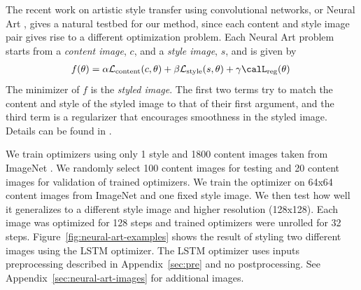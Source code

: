 \documentclass{article}
\begin{document}
The recent work on artistic style transfer using convolutional networks, or
Neural Art \citep{gatys:2015}, gives a natural testbed for our method, since
each content and style image pair gives rise to a different optimization
problem.  Each Neural Art problem starts from a \emph{content image}, $c$, and
a \emph{style image}, $s$, and is given by
\begin{align*}
f(\theta) = \alpha \mathcal{L}_\mathrm{content}(c, \theta)
+ \beta \mathcal{L}_\mathrm{style}(s, \theta) + \gamma \calL_{\mathrm{reg}}(\theta)
\,
\end{align*}
The minimizer of $f$ is the \emph{styled image}.
The first two terms try to match the content and style of the styled image to that of their first argument, and the third term is a regularizer that encourages smoothness in the styled image.
Details can be found in \citep{gatys:2015}.


We train optimizers using only 1 style and 1800 content images taken from
ImageNet \citep{deng:2009}.  We randomly select 100 content images for testing
and 20 content images for validation of trained optimizers.  We train the
optimizer on 64x64 content images from ImageNet and one fixed style image.  We
then test how well it generalizes to a different style image and higher
resolution (128x128).  Each image was optimized for 128 steps and trained
optimizers were unrolled for 32 steps.  Figure~\ref{fig:neural-art-examples}
shows the result of styling two different images using the LSTM optimizer.  The
LSTM optimizer uses inputs preprocessing described in Appendix~\ref{sec:pre}
and no postprocessing. See Appendix~\ref{sec:neural-art-images} for additional images.
\end{document}
